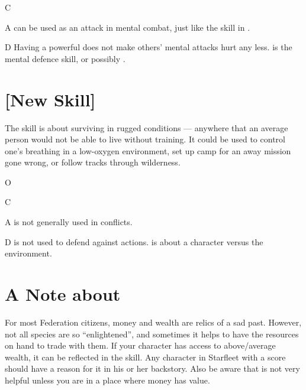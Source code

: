 \documentclass[12pt,titlepage,openany]{book}
\begin{document}
\begin{NewSkillAction}[+]{C}
    \TBW
\end{NewSkillAction}

\begin{NewSkillAction}{A}
     can be used as an attack in mental combat, just like the
     skill in \FateCore{}.
\end{NewSkillAction}

\begin{NewSkillAction}{D}
    Having a powerful  does not make others' mental attacks
    hurt any less.  is the mental defence skill, or possibly
    .
\end{NewSkillAction}

\section{ [New Skill]}\label{sec:survival}
The  skill is about surviving in rugged conditions --- anywhere
that an average person would not be able to live without training. It could be
used to control one's breathing in a low-oxygen environment, set up camp for an
away mission gone wrong, or follow tracks through wilderness.

\vspace{1ex}

\begin{NewSkillAction}[+]{O}
    \TBW
\end{NewSkillAction}

\begin{NewSkillAction}[+]{C}
    \TBW
\end{NewSkillAction}

\begin{NewSkillAction}[+]{A}
     is not generally used in conflicts.
\end{NewSkillAction}

\begin{NewSkillAction}{D}
     is not used to defend against actions.  is
    about a character versus the environment.
\end{NewSkillAction}

\section{A Note about }\label{sec:note-resources}
For most Federation citizens, money and wealth are relics of a sad past.
However, not all species are so ``enlightened'', and sometimes it helps to have
the resources on hand to trade with them. If your character has access to
above\-/average wealth, it can be reflected in the  skill. Any
character in Starfleet with a  score should have a reason for
it in his or her backstory. Also be aware that  is not very
helpful unless you are in a place where money has value.
\end{document}
